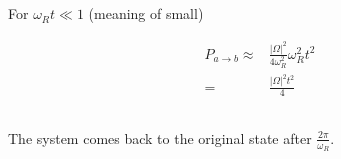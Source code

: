 \documentclass[10pt,fleqn]{article}
\newcommand{\eqar}[1]
{
  \begin{align*}
    #1
  \end{align*}
}
\newcommand{\abs}[1]{{\left|{#1}\right|}}
\begin{document}
\subsection{}
For $\omega_Rt\ll1$ (meaning of small)
\eqar{
  P_{a\rightarrow b}\approx&\frac{\abs{\Omega}^2}{4\omega_R^2}\omega_R^2t^2\\
  =&\frac{\abs{\Omega}^2t^2}{4}
}
\subsection{}
The system comes back to the original state after $\frac{2\pi}{\omega_R}$.
\section{}
\subsection{}
\subsection{}
\end{document}
